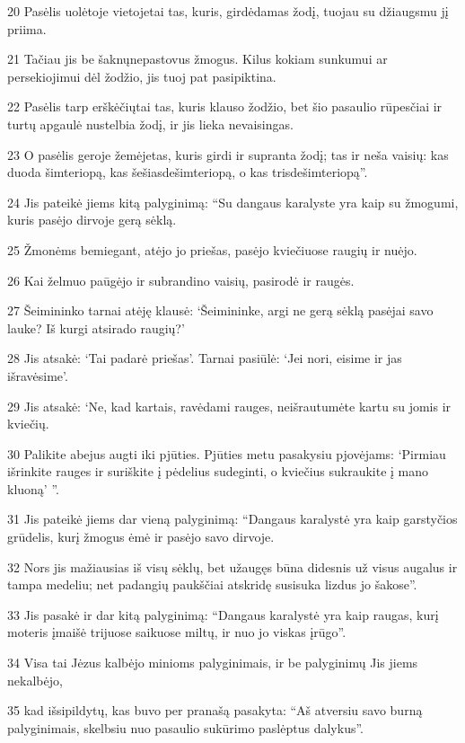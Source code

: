 \par 20 Pasėlis uolėtoje vietoje­tai tas, kuris, girdėdamas žodį, tuojau su džiaugsmu jį priima. 
\par 21 Tačiau jis be šaknų­nepastovus žmogus. Kilus kokiam sunkumui ar persekiojimui dėl žodžio, jis tuoj pat pasipiktina. 
\par 22 Pasėlis tarp erškėčių­tai tas, kuris klauso žodžio, bet šio pasaulio rūpesčiai ir turtų apgaulė nustelbia žodį, ir jis lieka nevaisingas. 
\par 23 O pasėlis geroje žemėje­tas, kuris girdi ir supranta žodį; tas ir neša vaisių: kas duoda šimteriopą, kas šešiasdešimteriopą, o kas trisdešimteriopą”. 
\par 24 Jis pateikė jiems kitą palyginimą: “Su dangaus karalyste yra kaip su žmogumi, kuris pasėjo dirvoje gerą sėklą. 
\par 25 Žmonėms bemiegant, atėjo jo priešas, pasėjo kviečiuose raugių ir nuėjo. 
\par 26 Kai želmuo paūgėjo ir subrandino vaisių, pasirodė ir raugės. 
\par 27 Šeimininko tarnai atėję klausė: ‘Šeimininke, argi ne gerą sėklą pasėjai savo lauke? Iš kurgi atsirado raugių?’ 
\par 28 Jis atsakė: ‘Tai padarė priešas’. Tarnai pasiūlė: ‘Jei nori, eisime ir jas išravėsime’. 
\par 29 Jis atsakė: ‘Ne, kad kartais, ravėdami rauges, neišrautumėte kartu su jomis ir kviečių. 
\par 30 Palikite abejus augti iki pjūties. Pjūties metu pasakysiu pjovėjams: ‘Pirmiau išrinkite rauges ir suriškite į pėdelius sudeginti, o kviečius sukraukite į mano kluoną’ ”. 
\par 31 Jis pateikė jiems dar vieną palyginimą: “Dangaus karalystė yra kaip garstyčios grūdelis, kurį žmogus ėmė ir pasėjo savo dirvoje. 
\par 32 Nors jis mažiausias iš visų sėklų, bet užaugęs būna didesnis už visus augalus ir tampa medeliu; net padangių paukščiai atskridę susisuka lizdus jo šakose”. 
\par 33 Jis pasakė ir dar kitą palyginimą: “Dangaus karalystė yra kaip raugas, kurį moteris įmaišė trijuose saikuose miltų, ir nuo jo viskas įrūgo”. 
\par 34 Visa tai Jėzus kalbėjo minioms palyginimais, ir be palyginimų Jis jiems nekalbėjo, 
\par 35 kad išsipildytų, kas buvo per pranašą pasakyta: “Aš atversiu savo burną palyginimais, skelbsiu nuo pasaulio sukūrimo paslėptus dalykus”. 
